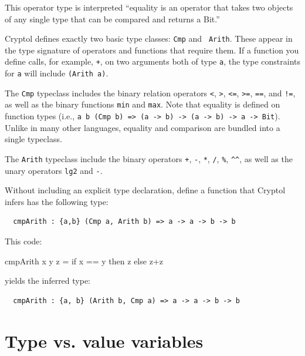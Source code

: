 This operator type is interpreted ``equality is an operator that takes
two objects of any single type that can be compared and returns a
Bit.''  

Cryptol defines exactly two basic type classes: {\tt Cmp} and {\tt
  Arith}.  These appear in the type signature of operators and
functions that require them.  If a function you define calls, for
example, {\tt +}, on two arguments both of type {\tt a}, the type
constraints for {\tt a} will include {\tt (Arith a)}.

The \texttt{Cmp} typeclass includes the binary relation operators
\texttt{<}, \texttt{>}, \texttt{<=}, \texttt{>=}, \texttt{==}, and
\texttt{!=}, as well as the binary functions \texttt{min} and
\texttt{max}.  Note that equality is defined on function types (i.e.,
\texttt{{a b} (Cmp b) => (a -> b) -> (a -> b) -> a -> Bit}).  Unlike
in many other languages, equality and comparison are bundled into a
single typeclass.

The \texttt{Arith} typeclass include the binary operators \texttt{+},
\texttt{-}, \texttt{*}, \texttt{/}, \verb+%+, \verb+^^+, as well
as the unary operators \texttt{lg2} and \texttt{-}.

\begin{Exercise}\label{ex:tvar:1}
  Without including an explicit type declaration, define a function
  that Cryptol infers has the following type:
\begin{Verbatim}
  cmpArith : {a,b} (Cmp a, Arith b) => a -> a -> b -> b
\end{Verbatim}
\end{Exercise}
\begin{Answer}
This code:
\begin{code}
  cmpArith x y z = if x == y then z else z+z
\end{code}
yields the inferred type:
\begin{Verbatim}
  cmpArith : {a, b} (Arith b, Cmp a) => a -> a -> b -> b
\end{Verbatim}
\end{Answer}

\section{Type vs. value variables}\indTypeVariables
\label{sec:type-vs.-value}


